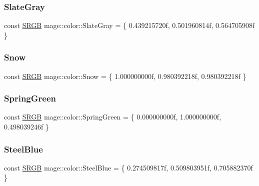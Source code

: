 \hypertarget{namespacemage_1_1color_aabbc96be90fc5f063070661402f7d543}{}\label{namespacemage_1_1color_aabbc96be90fc5f063070661402f7d543} 
\subsubsection{\texorpdfstring{Slate\+Gray}{SlateGray}}
{\footnotesize\ttfamily const \hyperlink{structmage_1_1_s_r_g_b}{S\+R\+GB} mage\+::color\+::\+Slate\+Gray = \{ 0.\+439215720f, 0.\+501960814f, 0.\+564705908f \}}

\hypertarget{namespacemage_1_1color_aeeb0f5613c8d9f1f8d6cb9b618b81536}{}\label{namespacemage_1_1color_aeeb0f5613c8d9f1f8d6cb9b618b81536} 
\subsubsection{\texorpdfstring{Snow}{Snow}}
{\footnotesize\ttfamily const \hyperlink{structmage_1_1_s_r_g_b}{S\+R\+GB} mage\+::color\+::\+Snow = \{ 1.\+000000000f, 0.\+980392218f, 0.\+980392218f \}}

\hypertarget{namespacemage_1_1color_ade7b2c7df029ca970a08a753184303a3}{}\label{namespacemage_1_1color_ade7b2c7df029ca970a08a753184303a3} 
\subsubsection{\texorpdfstring{Spring\+Green}{SpringGreen}}
{\footnotesize\ttfamily const \hyperlink{structmage_1_1_s_r_g_b}{S\+R\+GB} mage\+::color\+::\+Spring\+Green = \{ 0.\+000000000f, 1.\+000000000f, 0.\+498039246f \}}

\hypertarget{namespacemage_1_1color_a09d674790af6985e060392d528e3771d}{}\label{namespacemage_1_1color_a09d674790af6985e060392d528e3771d} 
\subsubsection{\texorpdfstring{Steel\+Blue}{SteelBlue}}
{\footnotesize\ttfamily const \hyperlink{structmage_1_1_s_r_g_b}{S\+R\+GB} mage\+::color\+::\+Steel\+Blue = \{ 0.\+274509817f, 0.\+509803951f, 0.\+705882370f \}}

